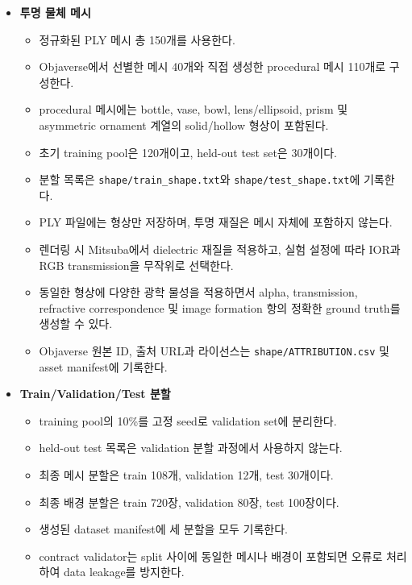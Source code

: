 \begin{itemize}
    \item \textbf{투명 물체 메시}
    \begin{itemize}
        \item 정규화된 PLY 메시 총 150개를 사용한다.
        \item Objaverse에서 선별한 메시 40개와 직접 생성한 procedural 메시
        110개로 구성한다.
        \item procedural 메시에는 bottle, vase, bowl, lens/ellipsoid,
        prism 및 asymmetric ornament 계열의 solid/hollow 형상이 포함된다.
        \item 초기 training pool은 120개이고, held-out test set은 30개이다.
        \item 분할 목록은 \texttt{shape/train\_shape.txt}와
        \texttt{shape/test\_shape.txt}에 기록한다.
        \item PLY 파일에는 형상만 저장하며, 투명 재질은 메시 자체에 포함하지
        않는다.
        \item 렌더링 시 Mitsuba에서 dielectric 재질을 적용하고, 실험 설정에
        따라 IOR과 RGB transmission을 무작위로 선택한다.
        \item 동일한 형상에 다양한 광학 물성을 적용하면서 alpha,
        transmission, refractive correspondence 및 image formation 항의
        정확한 ground truth를 생성할 수 있다.
        \item Objaverse 원본 ID, 출처 URL과 라이선스는
        \texttt{shape/ATTRIBUTION.csv} 및 asset manifest에 기록한다.
    \end{itemize}

    \item \textbf{Train/Validation/Test 분할}
    \begin{itemize}
        \item training pool의 10\%를 고정 seed로 validation set에 분리한다.
        \item held-out test 목록은 validation 분할 과정에서 사용하지 않는다.
        \item 최종 메시 분할은 train 108개, validation 12개, test 30개이다.
        \item 최종 배경 분할은 train 720장, validation 80장, test 100장이다.
        \item 생성된 dataset manifest에 세 분할을 모두 기록한다.
        \item contract validator는 split 사이에 동일한 메시나 배경이 포함되면
        오류로 처리하여 data leakage를 방지한다.
    \end{itemize}


\end{itemize}
